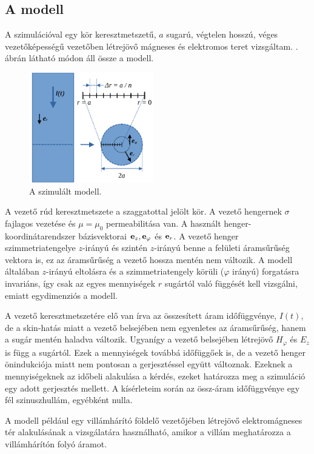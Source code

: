         \subsection{A modell}
            A szimulációval egy kör keresztmetszetű, $a$ sugarú, végtelen hosszú, véges vezetőképességű vezetőben létrejövő mágneses és elektromos teret vizsgáltam. . ábrán látható módon áll össze a modell. 
            \par
            \begin{figure}[h!]
                \centering
                \includegraphics[width=0.48\textwidth]{kep/modell.pdf}
                \caption{A szimulált modell.}
                \label{fig:modell}
            \end{figure}
             A vezető rúd keresztmetszete a szaggatottal jelölt kör. A vezető hengernek $\sigma$ fajlagos vezetése és $\mu=\mu_0$ permeabilitása van. A használt henger-koordinátarendszer bázisvektorai ${\bf e}_{z}, {\bf e}_{\varphi}$ és ${\bf e}_{r}$. A vezető henger szimmetriatengelye $z$-irányú és szintén $z$-irányú benne a felületi áramsűrűség vektora is, ez az áramsűrűség a vezető hossza mentén nem változik. A modell általában $z$-irányú eltolásra és a szimmetriatengely körüli ($\varphi$ irányú) forgatásra invariáns, így  csak az egyes mennyiségek $r$ sugártól való függését kell vizsgálni, emiatt egydimenziós a modell.
             \par
             A vezető keresztmetszetére elő van írva az összesített áram időfüggvénye, $I(t)$, de a skin-hatás miatt a vezető belsejében nem egyenletes az áramsűrűség, hanem a sugár mentén haladva változik. Ugyanígy a vezető belsejében létrejövő $H_\varphi$ és $E_z$ is függ a sugártól. Ezek a mennyiségek továbbá időfüggőek is, de a vezető henger önindukciója miatt nem pontosan a gerjesztéssel együtt változnak. Ezeknek a mennyiségeknek az időbeli alakulása a kérdés, ezeket határozza meg a szimuláció egy adott gerjesztés mellett. A kísérleteim során az össz-áram időfüggvénye egy fél szinuszhullám, egyébként nulla.
            \par
            A modell például egy villámhárító földelő vezetőjében létrejövő elektromágneses tér alakulásának a vizsgálatára használható, amikor a villám meghatározza a villámhárítón folyó áramot.
